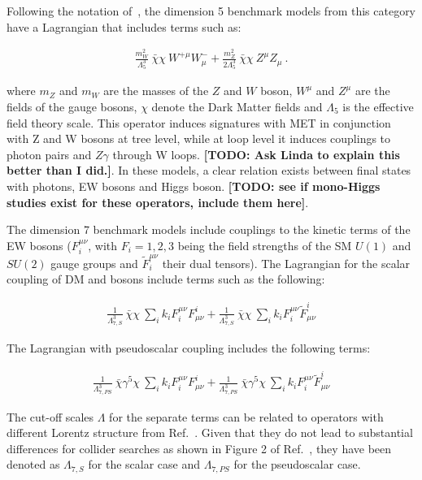 Following the notation of~\cite{Carpenter:2012rg}, the dimension 5 benchmark models 
from this category have a Lagrangian that includes terms such as:

\begin{eqnarray}
\frac{m_W^2}{\Lambda_5^3} ~\bar{\chi} \chi ~W^{+ \mu} W^{-}_\mu
+ \frac{m_Z^2}{2 \Lambda_5^3} ~ \bar{\chi} \chi ~ Z^\mu Z_\mu ~.
\end{eqnarray}
 
where $m_Z$ and $m_W$ are the masses of the $Z$ and $W$ boson, $W^{\mu}$ and $Z^{\mu}$
are the fields of the gauge bosons, $\chi$ denote the Dark Matter fields 
and $\Lambda_5$ is the effective field theory scale. This operator 
induces signatures with MET in conjunction with Z and W bosons at tree level,
while at loop level it induces couplings to photon pairs and $Z \gamma$ through W loops. 
\textbf{[TODO: Ask Linda to explain this better than I did.]}.  
In these models, a clear relation exists between final states with photons, EW bosons
and Higgs boson. \textbf{[TODO: see if mono-Higgs studies exist for these operators, include them here]}.

The dimension 7 benchmark models include couplings to the kinetic
terms of the EW bosons ($F^{\mu\nu}_i$, with $F_i=1,2,3$ being the field strengths
of the SM $U(1)$ and $SU(2)$ gauge groups and $\tilde F^{\mu\nu}_i$ their dual tensors). 
The Lagrangian for the scalar coupling of DM and bosons include terms such as the following:

\begin{eqnarray}
\frac{1}{\Lambda_{7,S}^3} ~\bar{\chi} \chi ~ \sum_i k_i  F_i^{\mu \nu} F^i_{\mu \nu} + 
\frac{1}{\Lambda_{7,S}^3} ~\bar{\chi} \chi ~ \sum_i k_i  F_i^{\mu \nu} \tilde F^i_{\mu \nu}
\end{eqnarray}

The Lagrangian with pseudoscalar coupling includes the following terms:

\begin{eqnarray}
\frac{1}{\Lambda_{7,PS}^3} ~\bar{\chi} \gamma^5 \chi ~ \sum_i k_i  F_i^{\mu \nu} F^i_{\mu \nu} +
\frac{1}{\Lambda_{7,PS}^3} ~\bar{\chi} \gamma^5 \chi ~ \sum_i k_i  F_i^{\mu \nu} \tilde F^i_{\mu \nu}
\end{eqnarray}

The cut-off scales $\Lambda$ for the separate terms can be related to operators with different 
Lorentz structure from Ref.~\cite{Cotta:2012nj}. Given that they do not lead to 
substantial differences for collider searches as shown in Figure 2 of Ref.~\cite{Carpenter:2012rg}, 
they have been denoted as $\Lambda_{7,S}$ for the scalar case and  $\Lambda_{7,PS}$ for the pseudoscalar
case. 

